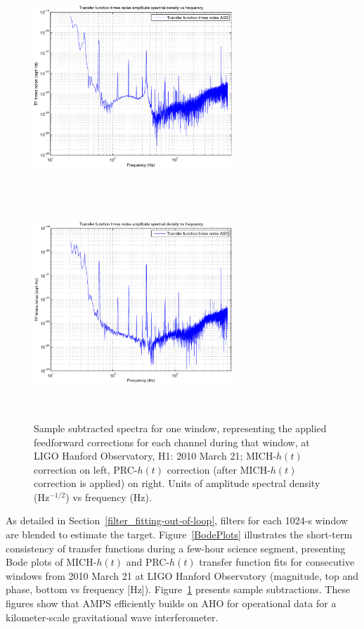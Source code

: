 \begin{figure}
\begin{center}
\includegraphics[height=80mm, width=75mm]{figure5a.eps}
\includegraphics[height=80mm, width=75mm]{figure5b.eps}
\caption{Sample subtracted spectra for one window, representing the applied feedforward corrections for each channel during that window, at LIGO Hanford Observatory, H1: 2010 March 21; MICH-$h(t)$ correction on left, PRC-$h(t)$ correction (after MICH-$h(t)$ correction is applied) on right. Units of amplitude spectral density (Hz$^{-1/2}$) vs frequency (Hz).}
\label{subtractedSpectrum}
\end{center}
\end{figure}

As detailed in Section~\ref{filter_fitting-out-of-loop}, filters for each 1024-s window are blended to estimate the target. Figure~\ref{BodePlots} illustrates the short-term consistency of transfer functions during a few-hour science segment, presenting Bode plots of MICH-$h(t)$ and PRC-$h(t)$ transfer function fits for consecutive windows from 2010 March 21 at LIGO Hanford Observatory (magnitude, top and phase, bottom vs frequency [Hz]).  Figure~\ref{subtractedSpectrum} presents sample subtractions. These figures show that AMPS efficiently builds on AHO for operational data for a kilometer-scale gravitational wave interferometer.

